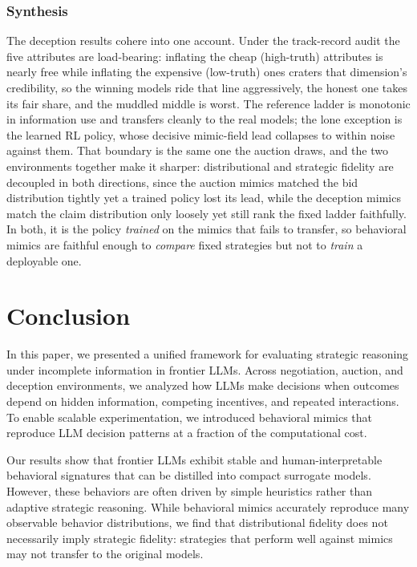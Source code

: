 \documentclass[conference]{IEEEtran}
\begin{document}
\subsubsection{Synthesis}
The deception results cohere into one account. Under the track-record audit the five attributes are load-bearing: inflating the cheap (high-truth) attributes is nearly free while inflating the expensive (low-truth) ones craters that dimension's credibility, so the winning models ride that line aggressively, the honest one takes its fair share, and the muddled middle is worst. The reference ladder is monotonic in information use and transfers cleanly to the real models; the lone exception is the learned RL policy, whose decisive mimic-field lead collapses to within noise against them. That boundary is the same one the auction draws, and the two environments together make it sharper: distributional and strategic fidelity are decoupled in both directions, since the auction mimics matched the bid distribution tightly yet a trained policy lost its lead, while the deception mimics match the claim distribution only loosely yet still rank the fixed ladder faithfully. In both, it is the policy \emph{trained} on the mimics that fails to transfer, so behavioral mimics are faithful enough to \emph{compare} fixed strategies but not to \emph{train} a deployable one.

\section{Conclusion}

In this paper, we presented a unified framework for evaluating strategic reasoning under incomplete information in frontier LLMs. Across negotiation, auction, and deception environments, we analyzed how LLMs make decisions when outcomes depend on hidden information, competing incentives, and repeated interactions. To enable scalable experimentation, we introduced behavioral mimics that reproduce LLM decision patterns at a fraction of the computational cost.

Our results show that frontier LLMs exhibit stable and human-interpretable behavioral signatures that can be distilled into compact surrogate models. However, these behaviors are often driven by simple heuristics rather than adaptive strategic reasoning. While behavioral mimics accurately reproduce many observable behavior distributions, we find that distributional fidelity does not necessarily imply strategic fidelity: strategies that perform well against mimics may not transfer to the original models.
\end{document}
